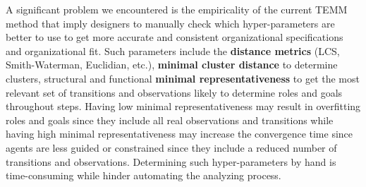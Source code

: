\documentclass[pdflatex,sn-mathphys-num]{sn-jnl}%
\theoremstyle{thmstyleone}%
\theoremstyle{thmstyletwo}%
\theoremstyle{thmstylethree}%
\begin{document}
A significant problem we encountered is the empiricality of the current TEMM method that imply designers to manually check which hyper-parameters are better to use to get more accurate and consistent organizational specifications and organizational fit. Such parameters include the \textbf{distance metrics} (LCS, Smith-Waterman, Euclidian, etc.), \textbf{minimal cluster distance} to determine clusters, structural and functional \textbf{minimal representativeness} to get the most relevant set of transitions and observations likely to determine roles and goals throughout steps. Having low minimal representativeness may result in overfitting roles and goals since they include all real observations and transitions while having high minimal representativeness may increase the convergence time since agents are less guided or constrained since they include a reduced number of transitions and observations. Determining such hyper-parameters by hand is time-consuming while hinder automating the analyzing process.
\end{document}
